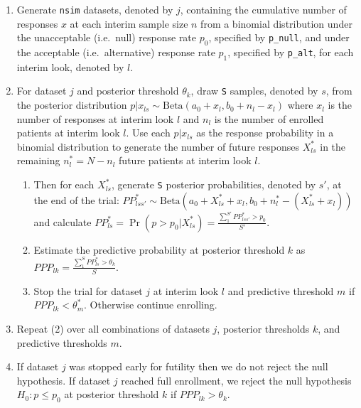 \begin{enumerate}
\def\labelenumi{\arabic{enumi}.}
\item
  Generate \texttt{nsim} datasets, denoted by \(j\), containing the
  cumulative number of responses \(x\) at each interim sample size \(n\)
  from a binomial distribution under the unacceptable (i.e.~null)
  response rate \(p_0\), specified by \texttt{p\_null}, and under the
  acceptable (i.e.~alternative) response rate \(p_1\), specified by
  \texttt{p\_alt}, for each interim look, denoted by \(l\).
\item
  For dataset \(j\) and posterior threshold \(\theta_k\), draw
  \texttt{S} samples, denoted by \(s\), from the posterior distribution
  \(p|x_{ls} \sim \mbox{Beta}(a_0 + x_l, b_0 + n_l - x_l)\) where
  \(x_l\) is the number of responses at interim look \(l\) and \(n_l\)
  is the number of enrolled patients at interim look \(l\). Use each
  \(p|x_{ls}\) as the response probability in a binomial distribution to
  generate the number of future responses \(X^*_{ls}\) in the remaining
  \(n^*_l=N-n_l\) future patients at interim look \(l\).

  \begin{enumerate}
  \def\labelenumii{\alph{enumii}.}
  \tightlist
  \item
    Then for each \(X^*_{ls}\), generate \texttt{S} posterior
    probabilities, denoted by \(s'\), at the end of the trial:
    \(PP^*_{lss'} \sim \mbox{Beta}(a_0 + X^*_{ls} + x_l, b_0 + n^*_l - (X^*_{ls} + x_l))\)
    and calculate
    \(PP^*_{ls} = \Pr(p>p_0 | X^*_{ls}) = \frac{\sum_1^{S'} PP^*_{lss'} > p_0}{S'}\).
  \item
    Estimate the predictive probability at posterior threshold \(k\) as
    \(PPP_{lk} = \frac{\sum_1^S PP^*_{ls}>\theta_k}{S}\).
  \item
    Stop the trial for dataset \(j\) at interim look \(l\) and
    predictive threshold \(m\) if \(PPP_{lk} < \theta^*_m\). Otherwise
    continue enrolling.
  \end{enumerate}
\item
  Repeat (2) over all combinations of datasets \(j\), posterior
  thresholds \(k\), and predictive thresholds \(m\).
\item
  If dataset \(j\) was stopped early for futility then we do not reject
  the null hypothesis. If dataset \(j\) reached full enrollment, we
  reject the null hypothesis \(H_0: p \leq p_0\) at posterior threshold
  \(k\) if \(PPP_{lk} > \theta_k\).
\end{enumerate}

